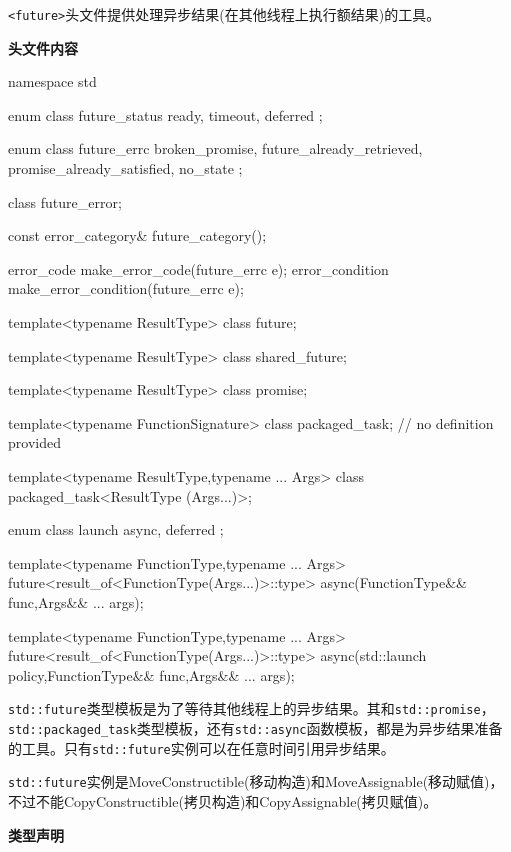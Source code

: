 
\texttt{<future>}头文件提供处理异步结果(在其他线程上执行额结果)的工具。

\textbf{头文件内容}

\begin{cpp}
namespace std
{
  enum class future_status {
      ready, timeout, deferred };

  enum class future_errc
  {
    broken_promise,
    future_already_retrieved,
    promise_already_satisfied,
    no_state
  };

  class future_error;

  const error_category& future_category();

  error_code make_error_code(future_errc e);
  error_condition make_error_condition(future_errc e);

  template<typename ResultType>
  class future;

  template<typename ResultType>
  class shared_future;

  template<typename ResultType>
  class promise;

  template<typename FunctionSignature>
  class packaged_task; // no definition provided

  template<typename ResultType,typename ... Args>
  class packaged_task<ResultType (Args...)>;

  enum class launch {
    async, deferred
  };

  template<typename FunctionType,typename ... Args>
  future<result_of<FunctionType(Args...)>::type>
  async(FunctionType&& func,Args&& ... args);

  template<typename FunctionType,typename ... Args>
  future<result_of<FunctionType(Args...)>::type>
  async(std::launch policy,FunctionType&& func,Args&& ... args);
}
\end{cpp}


\texttt{std::future}类型模板是为了等待其他线程上的异步结果。其和\texttt{std::promise}，\texttt{std::packaged\_task}类型模板，还有\texttt{std::async}函数模板，都是为异步结果准备的工具。只有\texttt{std::future}实例可以在任意时间引用异步结果。

\texttt{std::future}实例是MoveConstructible(移动构造)和MoveAssignable(移动赋值)，不过不能CopyConstructible(拷贝构造)和CopyAssignable(拷贝赋值)。

\textbf{类型声明}

